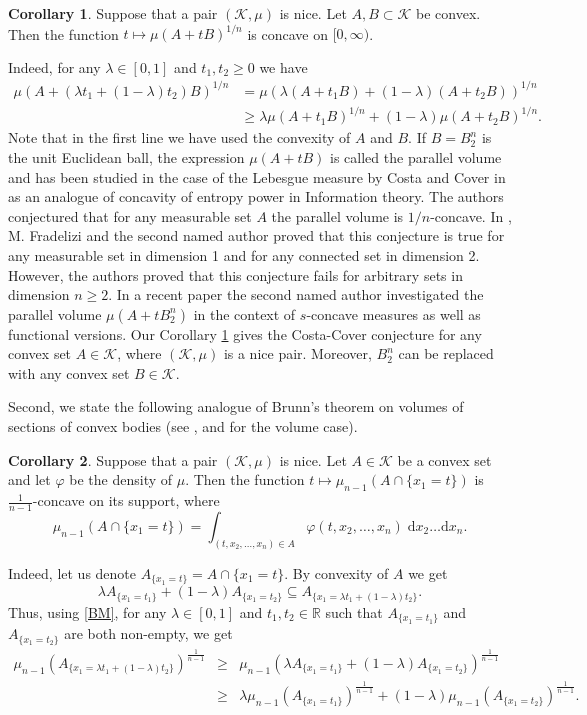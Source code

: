 \documentclass[11pt]{article}
\newcommand{\call}[4]{\int_{#1}^{#2} {#3} \; \textrm{d} {#4}}
\newcommand{\mb}[1]{\mathbb{{#1}}}
\newcommand{\mc}[1]{\mathcal{{#1}}}
\newcommand{\1}{\mathbf{{1}}}
\newcommand{\vp}{\varphi}
\theoremstyle{definition}
\newtheorem{cor}{Corollary}
\begin{document}
\begin{cor}\label{parvol}
Suppose that a pair $(\mc{K},\mu)$ is nice. Let $A,B \subset \mc{K}$ be convex. Then the function $t \mapsto \mu(A+tB)^{1/n}$ is concave on $[0,\infty)$.
\end{cor}

\noindent Indeed, for any $\lambda \in [0,1]$ and $t_1,t_2 \geq 0$ we have
\begin{align*}
	\mu(A+(\lambda t_1 + (1-\lambda)t_2)B)^{1/n} & = \mu(\lambda (A + t_1 B)+(1-\lambda) (A + t_2 B))^{1/n} \\
	& \geq \lambda  \mu(A + t_1 B)^{1/n} + (1-\lambda) \mu(A + t_2 B)^{1/n}.
\end{align*}
Note that in the first line we have used the convexity of $A$ and $B$. If $B=B_2^n$ is the unit Euclidean ball, the expression $\mu(A+tB)$ is called the parallel volume and has been studied in the case of the Lebesgue measure by Costa and Cover in \cite{C} as an analogue of concavity of entropy power in Information theory. The authors conjectured that for any measurable set $A$ the parallel volume is $1/n$-concave. In \cite{FM}, M. Fradelizi and the second named author proved that this conjecture is true for any measurable set in dimension 1 and for any connected set in dimension 2. However, the authors proved that this conjecture fails for arbitrary sets in dimension $n \geq 2$. In a recent paper \cite{M} the second named author investigated the parallel volume $\mu(A+ tB_2^n)$ in the context of $s$-concave measures as well as functional versions. Our Corollary \ref{parvol} gives the Costa-Cover conjecture for any convex set $A \in \mc{K}$, where $(\mc{K},\mu)$ is a nice pair. Moreover, $B_2^n$ can be replaced with any convex set $B \in \mc{K}$.

Second, we  state the following analogue of Brunn's theorem on volumes of sections of convex bodies (see \cite{G1}, \cite{G2} and \cite{Sn} for the volume case).

\begin{cor}\label{Brunn}
Suppose that a pair $(\mc{K},\mu)$ is nice. Let $A \in \mc{K}$ be a convex set and let $\vp$ be the density of $\mu$. Then the function $t \mapsto \mu_{n-1}(A \cap \{x_1=t\})$ is $\frac{1}{n-1}$-concave on its support, where
\[
\mu_{n-1}(A \cap \{x_1=t\}) = \call{(t, x_2, \dots, x_n) \in A}{}{\vp(t, x_2, \dots, x_n)}{x_2 \dots \mathrm{d} x_n}.
\]
\end{cor}

\noindent Indeed, let us denote $A_{\{x_1=t\}}=A \cap \{x_1=t\}$. By convexity of $A$ we get $$\lambda A_{\{x_1=t_1\}} + (1-\lambda)A_{\{x_1=t_2\}} \subseteq  A_{\{x_1=\lambda t_1 + (1-\lambda)t_2\}}.$$ Thus, using \eqref{BM}, for any $\lambda \in [0,1]$ and $t_1, t_2 \in \mb{R}$ such that $A_{\{x_1=t_1\}}$ and $A_{\{x_1=t_2\}}$ are both non-empty, we get
\begin{eqnarray*}
	\mu_{n-1}(A_{\{x_1=\lambda t_1 + (1-\lambda)t_2\}})^{\frac{1}{n-1}} &\geq& \mu_{n-1}(\lambda A_{\{x_1=t_1\}} + (1-\lambda)A_{\{x_1=t_2\}})^{\frac{1}{n-1}} \\
	&\geq& \lambda \mu_{n-1}(A_{\{x_1=t_1\}})^{\frac{1}{n-1}} + (1-\lambda)\mu_{n-1}(A_{\{x_1=t_2\}})^{\frac{1}{n-1}}.
\end{eqnarray*}
\end{document}
